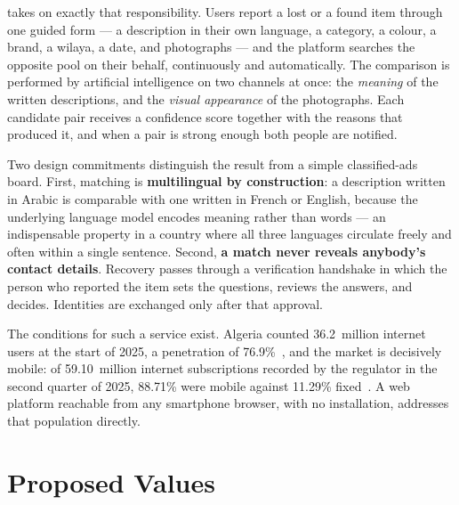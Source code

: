 \projectname{} takes on exactly that responsibility. Users report a lost or a
found item through one guided form --- a description in their own language, a
category, a colour, a brand, a wilaya, a date, and photographs --- and the
platform searches the opposite pool on their behalf, continuously and
automatically. The comparison is performed by artificial intelligence on two
channels at once: the \emph{meaning} of the written descriptions, and the
\emph{visual appearance} of the photographs. Each candidate pair receives a
confidence score together with the reasons that produced it, and when a pair is
strong enough both people are notified.

Two design commitments distinguish the result from a simple classified-ads
board. First, matching is \textbf{multilingual by construction}: a description
written in Arabic is comparable with one written in French or English, because
the underlying language model encodes meaning rather than words --- an
indispensable property in a country where all three languages circulate freely
and often within a single sentence. Second, \textbf{a match never reveals
anybody's contact details}. Recovery passes through a verification handshake in
which the person who reported the item sets the questions, reviews the answers,
and decides. Identities are exchanged only after that approval.

The conditions for such a service exist. Algeria counted 36.2~million internet
users at the start of 2025, a penetration of 76.9\%~\cite{datareportal2025},
and the market is decisively mobile: of 59.10~million internet subscriptions
recorded by the regulator in the second quarter of 2025, 88.71\% were mobile
against 11.29\% fixed~\cite{arpce2025}. A web platform reachable from any
smartphone browser, with no installation, addresses that population directly.

\section{Proposed Values}


